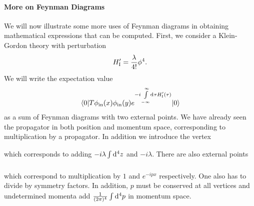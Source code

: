\paragraph{More on Feynman Diagrams}
We will now illustrate some more uses of Feynman diagrams in obtaining mathematical expressions that can be computed. First, we consider a Klein-Gordon theory with perturbation
\begin{align*}
	H_{\text{I}}^{\prime} = \frac{\lambda}{4!}\phi^{4}.
\end{align*}
We will write the expectation value
\begin{align*}
	\expval{\ensuremath{T}\phi_{\text{in}}(x)\phi_{\text{in}}(y)e^{-i\int\limits_{-\infty}^{\infty}\dd[]{\tau}H_{\text{I}}\ensuremath{^{\prime}}(\tau)}}{0}
\end{align*}
as a sum of Feynman diagrams with two external points. We have already seen the propagator in both position and momentum space, corresponding to multiplication by a propagator. In addition we introduce the vertex
\begin{figure}[!ht]
	\centering
\end{figure}
which corresponds to adding $-i\lambda\int\limits_{}^{}\dd[4]{z}$ and $-i\lambda$. There are also external points
\begin{figure}[!ht]
	\centering
\end{figure}
which correspond to multiplication by $1$ and $e^{-ipx}$ respectively. One also has to divide by symmetry factors. In addition, $p$ must be conserved at all vertices and undetermined momenta add $\frac{1}{(2\pi)^{4}}\int\limits_{}^{}\dd[4]{p}$ in momentum space.

